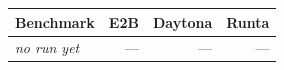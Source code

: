 %
%
\begin{tabular}{lrrr}
\toprule
Benchmark & E2B & Daytona & Runta \\
\midrule
\textit{no run yet} & --- & --- & --- \\
\bottomrule
\end{tabular}
